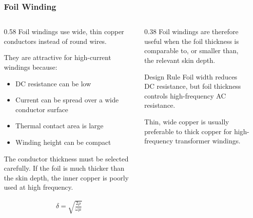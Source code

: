 \begin{frame}
    \frametitle{Foil Winding}

    \begin{columns}
        \begin{column}{0.58\textwidth}
            Foil windings use wide, thin copper conductors instead of round wires.

            \vspace{0.15cm}

            They are attractive for high-current windings because:
            \begin{itemize}
                \item DC resistance can be low
                \item Current can be spread over a wide conductor surface
                \item Thermal contact area is large
                \item Winding height can be compact
            \end{itemize}

            \vspace{0.15cm}

            The conductor thickness must be selected carefully. If the foil is much thicker than the skin depth, the inner copper is poorly used at high frequency.

            \begin{align}
                \delta = \sqrt{\frac{2\rho}{\omega \mu}}
            \end{align}
        \end{column}

        \begin{column}{0.38\textwidth}
            Foil windings are therefore useful when the foil thickness is comparable to, or smaller than, the relevant skin depth.
            \begin{block}{Design Rule}
                \small
                Foil width reduces DC resistance, but foil thickness controls high-frequency AC resistance.

                \vspace{0.15cm}

                Thin, wide copper is usually preferable to thick copper for high-frequency transformer windings.
            \end{block}
        \end{column}
    \end{columns}
\end{frame}


